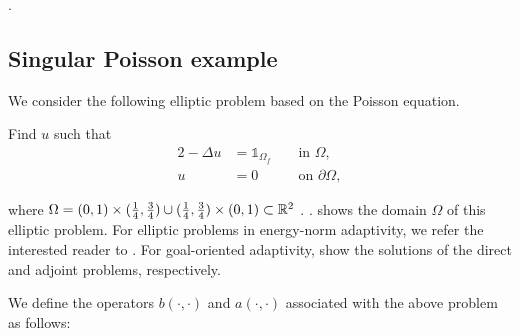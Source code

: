 \noindent {}.

\subsection{Singular Poisson example}
We consider the following elliptic problem based on the Poisson equation.
\begin{var_for}
  Find $u$ such that
  \begin{alignat}{2}
    - \Delta u & = \mathds{1}_{\Omega_{f}} &  & \text{ in } \Omega, \label{eq:poissongoal} \\
    u          & =0                        &  & \text{ on } {\partial \Omega},
  \end{alignat}
\end{var_for}
\noindent where $\Omega = (0,1) \times (\frac{1}{4},\frac{3}{4}) \cup (\frac{1}{4},\frac{3}{4}) \times (0,1) \subset \mathbb{R}^{2}$ . .  shows the domain $\Omega$ of this elliptic problem. For elliptic problems in energy-norm adaptivity, we refer the interested reader to \cite{darrigrand2020painless}. For goal-oriented adaptivity,  show the solutions of the direct and adjoint problems, respectively.

We define the operators $b(\cdot ,\cdot)$  and $a(\cdot ,\cdot)$ associated with the above problem as follows:


